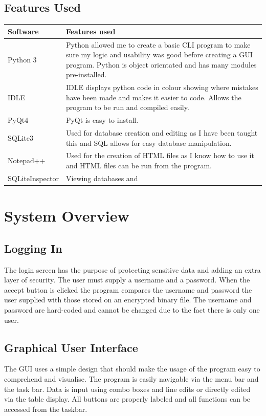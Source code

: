 \subsection{Features Used}
\begin{center}
	\begin{tabular}{|p{3cm}|p{6cm}|}
		\hline
		\textbf{Software}   & \textbf{Features used} \\ \hline
		Python 3 & Python allowed me to create a basic CLI program to make sure my logic and usability was good before creating a GUI program. Python is object orientated and has many modules pre-installed.\\ \hline
		IDLE &  IDLE displays python code in colour showing where mistakes have been made and makes it easier to code. Allows the program to be run and compiled easily. \\ \hline
		PyQt4 & PyQt is easy to install. \\ \hline
		SQLite3 & Used for database creation and editing as I have been taught this and SQL allows for easy database manipulation. \\ \hline
		Notepad++ & Used for the creation of HTML files as I know how to use it and HTML files can be run from the program. \\ \hline
		SQLiteInspector & Viewing databases and \\ \hline
	\end{tabular}
\end{center}


\section{System Overview}

\subsection{Logging In}
The login screen has the purpose of protecting sensitive data and adding an extra layer of security. The user must supply a username and a password. When the accept button is clicked the program compares the username and password the user supplied with those stored on an encrypted binary file. The username and password are hard-coded and cannot be changed due to the fact there is only one user.

\subsection{Graphical User Interface}
The GUI uses a simple design that should make the usage of the program easy to comprehend and visualise. The program is easily navigable via the menu bar and the task bar. Data is input using combo boxes and line edits or directly edited via the table display. All buttons are properly labeled and all functions can be accessed from the taskbar.

